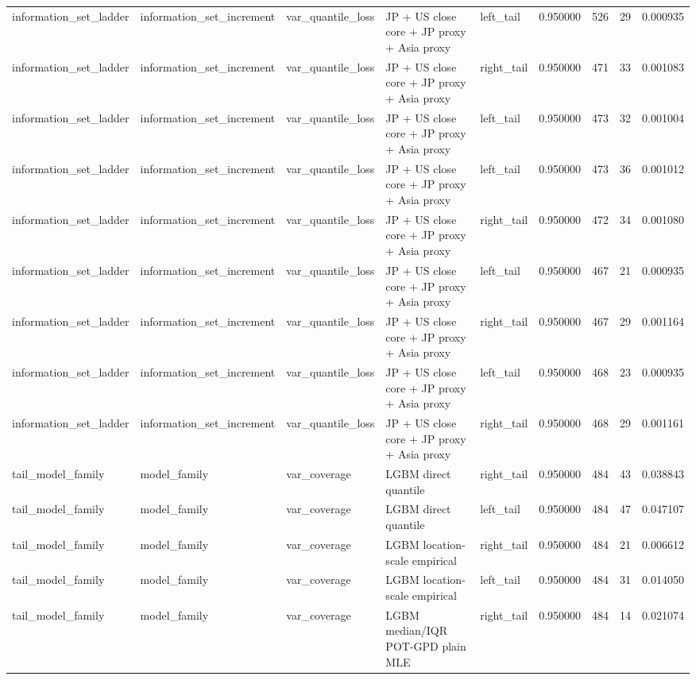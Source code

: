 \begin{tabular}{lllllrrr}
information\_set\_ladder & information\_set\_increment & var\_quantile\_loss & JP + US close core + JP proxy + Asia proxy & left\_tail & 0.950000 & 526 & 29 & 0.000935 \\
information\_set\_ladder & information\_set\_increment & var\_quantile\_loss & JP + US close core + JP proxy + Asia proxy & right\_tail & 0.950000 & 471 & 33 & 0.001083 \\
information\_set\_ladder & information\_set\_increment & var\_quantile\_loss & JP + US close core + JP proxy + Asia proxy & left\_tail & 0.950000 & 473 & 32 & 0.001004 \\
information\_set\_ladder & information\_set\_increment & var\_quantile\_loss & JP + US close core + JP proxy + Asia proxy & left\_tail & 0.950000 & 473 & 36 & 0.001012 \\
information\_set\_ladder & information\_set\_increment & var\_quantile\_loss & JP + US close core + JP proxy + Asia proxy & right\_tail & 0.950000 & 472 & 34 & 0.001080 \\
information\_set\_ladder & information\_set\_increment & var\_quantile\_loss & JP + US close core + JP proxy + Asia proxy & left\_tail & 0.950000 & 467 & 21 & 0.000935 \\
information\_set\_ladder & information\_set\_increment & var\_quantile\_loss & JP + US close core + JP proxy + Asia proxy & right\_tail & 0.950000 & 467 & 29 & 0.001164 \\
information\_set\_ladder & information\_set\_increment & var\_quantile\_loss & JP + US close core + JP proxy + Asia proxy & left\_tail & 0.950000 & 468 & 23 & 0.000935 \\
information\_set\_ladder & information\_set\_increment & var\_quantile\_loss & JP + US close core + JP proxy + Asia proxy & right\_tail & 0.950000 & 468 & 29 & 0.001161 \\
tail\_model\_family & model\_family & var\_coverage & LGBM direct quantile & right\_tail & 0.950000 & 484 & 43 & 0.038843 \\
tail\_model\_family & model\_family & var\_coverage & LGBM direct quantile & left\_tail & 0.950000 & 484 & 47 & 0.047107 \\
tail\_model\_family & model\_family & var\_coverage & LGBM location-scale empirical & right\_tail & 0.950000 & 484 & 21 & 0.006612 \\
tail\_model\_family & model\_family & var\_coverage & LGBM location-scale empirical & left\_tail & 0.950000 & 484 & 31 & 0.014050 \\
tail\_model\_family & model\_family & var\_coverage & LGBM median/IQR POT-GPD plain MLE & right\_tail & 0.950000 & 484 & 14 & 0.021074 \\

\end{tabular}
